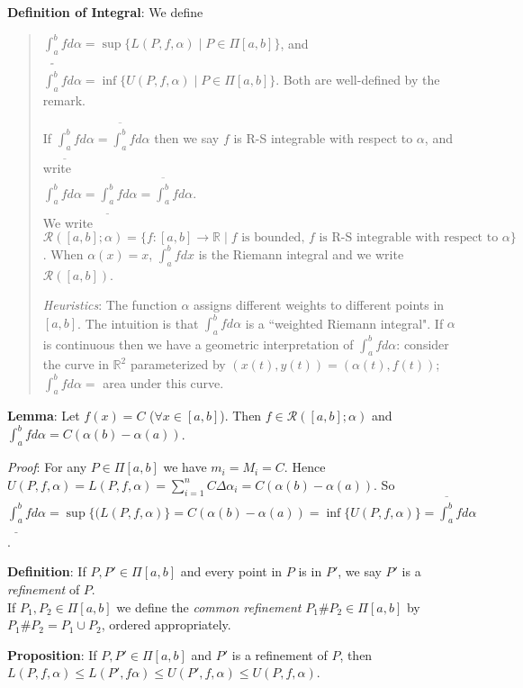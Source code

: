 \documentclass[11pt]{article}
\begin{document}
\textbf{Definition of Integral}: We define
\begin{quote}\vspace{-0.3cm}
$\underline{\int_a^b} f d\alpha = \sup \{L(P, f, \alpha) \mid P \in \Pi[a,b]\}$, and $\overline{\int_a^b} f d\alpha = \inf \{U(P, f, \alpha) \mid P \in \Pi[a,b]\}$. Both are well-defined by the remark.

If $\underline{\int_a^b} f d\alpha = \overline{\int_a^b} f d\alpha$ then we say $f$ is R-S integrable with respect to $\alpha$, and write\\ $\int_a^b f d\alpha = \underline{\int_a^b} f d\alpha = \overline{\int_a^b} f d\alpha$.\\

We write $\mathcal{R}([a,b]; \alpha) = \{f : [a,b] \to \mathbb{R} \mid f \text{ is bounded, } f \text{ is R-S integrable with respect to }\alpha\}$. When $\alpha(x) = x$, $\int_a^b f dx$ is the Riemann integral and we write $\mathcal{R}([a,b])$.

\emph{Heuristics}: The function $\alpha$ assigns different weights to different points in $[a,b]$. The intuition is that $\int_a^b f d\alpha$ is a ``weighted Riemann integral". If $\alpha$ is continuous then we have a geometric interpretation of $\int_a^b f d \alpha$: consider the curve in $\mathbb{R}^2$ parameterized by $(x(t), y(t)) = (\alpha(t), f(t))$; $\int_a^b f d\alpha =$ area under this curve.
\end{quote}

\textbf{Lemma}: Let $f(x) = C$ ($\forall x \in [a,b]$). Then $f \in \mathcal{R}([a,b]; \alpha)$ and $\int_a^b f d\alpha = C(\alpha(b) - \alpha(a))$.

\emph{Proof}: For any $P \in \Pi[a,b]$ we have $m_i = M_i = C$. Hence $U(P, f, \alpha) = L(P, f, \alpha) = \sum_{i=1}^n C \Delta \alpha_i = C(\alpha(b) - \alpha(a))$. So $\underline{\int_a^b} f d\alpha = \sup \{(L(P, f, \alpha)\} = C(\alpha(b) - \alpha(a)) = \inf \{U(P, f, \alpha)\} = \overline{\int_a^b} f d\alpha$.

\textbf{Definition}: If $P, P' \in \Pi[a,b]$ and every point in $P$ is in $P'$, we say $P'$ is a \emph{refinement} of $P$.\\
If $P_1, P_2 \in \Pi[a,b]$ we define the \emph{common refinement} $P_1 \# P_2 \in \Pi[a,b]$ by $P_1 \# P_2 = P_1 \cup P_2$, ordered appropriately.

\textbf{Proposition}: If $P, P' \in \Pi[a,b]$ and $P'$ is a refinement of $P$, then $L(P, f, \alpha) \leq L(P', f \alpha) \leq U(P', f, \alpha) \leq U(P, f, \alpha)$.\\
\end{document}
